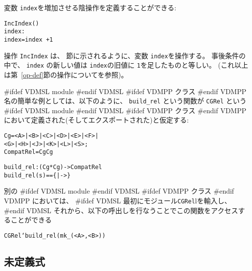 \documentclass[\pformat,12pt]{jarticle}
\begin{document}
\begin{description}
 変数 {\tt index}を増加させる陰操作を定義することができる:
  \begin{alltt}
    IncIndex()
     index : 
     index = index~ + 1
  \end{alltt}
 操作 {\tt IncIndex} は、 節に示されるように、変数 {\tt index}を操作する。
事後条件の中で、 {\tt index} の新しい値は {\tt index}の旧値に  \texttt{1}を足したものと等しい。
(これ以上は第~\ref{op-def}節の操作についてを参照)。

#ifdef VDMSL
module 
#endif VDMSL
#ifdef VDMPP
クラス
#endif VDMPP
名の簡単な例としては、以下のように、 \texttt{build\_rel} という関数が \texttt{CGRel} という
#ifdef VDMSL
module 
#endif VDMSL
#ifdef VDMPP
クラス
#endif VDMPP
において定義された(そしてエクスポートされた)と仮定する:
\begin{alltt}

    Cg = <A> | <B> | <C> | <D> | <E> | <F> | 
         <G> | <H> | <J> | <K> | <L> | <S>;
    CompatRel =  Cg  Cg


    build_rel :  (Cg * Cg) -> CompatRel
    build_rel (s) == \{|->\}
\end{alltt}
別の
#ifdef VDMSL
module 
#endif VDMSL
#ifdef VDMPP
クラス
#endif VDMPP
においては、
#ifdef VDMSL
最初にモジュール\texttt{CGRel}lを輸入し、 
#endif VDMSL
それから、以下の呼出しを行なうことでこの関数をアクセスすることができる
  \begin{alltt}
  CGRel`build_rel({mk_(<A>, <B>)})
  \end{alltt}


\end{description}

\subsection{未定義式}
\end{document}
